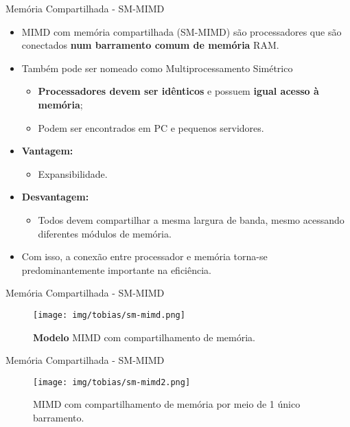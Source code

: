 \begin{frame}{Memória Compartilhada - SM-MIMD}
	\begin{itemize}
		\item MIMD com memória compartilhada (SM-MIMD) são processadores que são conectados \textbf{num barramento comum de memória} RAM.
		\item Também pode ser nomeado como Multiprocessamento Simétrico
		\begin{itemize}
			\item \textbf{Processadores devem ser idênticos} e possuem \textbf{igual acesso à memória};
			\item Podem ser encontrados em PC e pequenos servidores.
		\end{itemize}

				\bigskip
		\item \textbf{Vantagem:}
		\begin{itemize}
	    	\item Expansibilidade.
		\end{itemize}

		\item \textbf{Desvantagem:}
		\begin{itemize}
		    \item Todos devem compartilhar a mesma largura de banda, mesmo acessando diferentes módulos de memória.
		\end{itemize}

		\item Com isso, a conexão entre processador e memória torna-se predominantemente importante na eficiência.
	\end{itemize}

\end{frame}


\begin{frame}{Memória Compartilhada - SM-MIMD}
    \begin{figure}[h]
    	\centering
    	\texttt{[image: img/tobias/sm-mimd.png]}
    	\caption{\textbf{Modelo} MIMD com compartilhamento de memória.}
    	\label{fig:sm-mimd}
    \end{figure}

\end{frame}


\begin{frame}{Memória Compartilhada - SM-MIMD}
    \begin{figure}[h]
    	\centering
    	\texttt{[image: img/tobias/sm-mimd2.png]}
    	\caption{MIMD com compartilhamento de memória por meio de 1 único barramento.}
    	\label{fig:sm-mimd2}
    \end{figure}

\end{frame}


